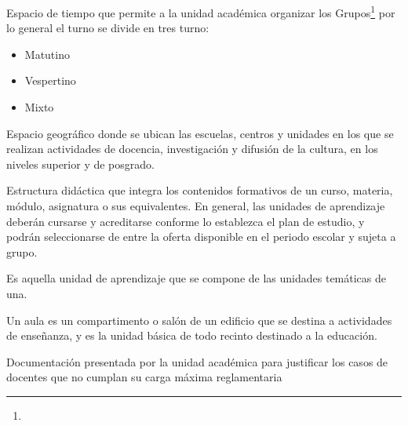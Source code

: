 \begin{bGlosario}
	
	 Espacio de tiempo que permite a la unidad académica organizar los Grupos\footnote{} por lo general el turno se divide en tres turno:
	\begin{itemize}
		\item Matutino
		\item Vespertino
		\item Mixto
	\end{itemize}

	 Espacio geográfico donde se ubican las escuelas, centros y unidades en los que se realizan actividades de docencia, investigación y difusión de la cultura, en los niveles superior y de posgrado.

	 Estructura didáctica que integra los contenidos formativos de un curso, materia, módulo, asignatura o sus equivalentes. En general, las unidades de aprendizaje deberán cursarse y acreditarse conforme lo establezca el plan de estudio, y podrán seleccionarse de entre la oferta disponible en el periodo escolar y sujeta a grupo. %
	
	 Es aquella unidad de aprendizaje que se compone de las unidades temáticas de una.

	 Un aula es un compartimento o salón de un edificio que se destina a actividades de enseñanza, y es la unidad básica de todo recinto destinado a la educación.	
		
	 Documentación presentada por la unidad académica para justificar los casos de docentes que no cumplan su carga máxima reglamentaria

\end{bGlosario}
